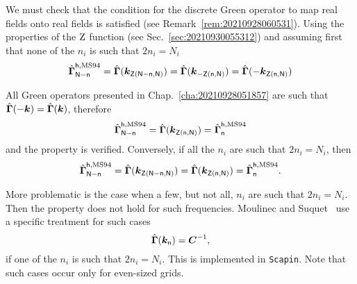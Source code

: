 We must check that the condition for the discrete Green operator to map real
fields onto real fields is satisfied (see
Remark~\ref{rem:20210928060531}). Using the properties of the \(\operatorname{Z}\)
function (see Sec.~\ref{sec:20210930055312}) and assuming first that none of the
\(n_i\) is such that \(2n_i=N_i\)
\begin{equation}
  \hat{\boldsymbol\Gamma}_{\mathsf N-\mathsf n}^{\mathsf h, \mathrm{MS94}}
  =\hat{\boldsymbol\Gamma}(\boldsymbol k_{\mathsf Z(\mathsf N-\mathsf n, \mathsf N)})
  =\hat{\boldsymbol\Gamma}(\boldsymbol k_{-\mathsf Z(\mathsf n, \mathsf N)})
  =\hat{\boldsymbol\Gamma}(-\boldsymbol k_{\mathsf Z(\mathsf n, \mathsf N)})
\end{equation}

All Green operators presented in Chap.~\ref{cha:20210928051857} are such that
\(\hat{\boldsymbol\Gamma}(-\boldsymbol k)=\hat{\boldsymbol\Gamma}(\boldsymbol k)\), therefore
\begin{equation}
  \hat{\boldsymbol\Gamma}_{\mathsf N-\mathsf n}^{\mathsf h, \mathrm{MS94}}
  =\hat{\boldsymbol\Gamma}(\boldsymbol k_{\mathsf Z(\mathsf n, \mathsf N)})
  =\hat{\boldsymbol\Gamma}_{\mathsf n}^{\mathsf h, \mathrm{MS94}}
\end{equation}
and the property is verified. Conversely, if all the \(n_i\) are such that
\(2n_i=N_i\), then
\begin{equation}
  \hat{\boldsymbol\Gamma}_{\mathsf N-\mathsf n}^{\mathsf h, \mathrm{MS94}}
  =\hat{\boldsymbol\Gamma}(\boldsymbol k_{\mathsf Z(\mathsf N-\mathsf n, \mathsf N)})
  =\hat{\boldsymbol\Gamma}(\boldsymbol k_{\mathsf Z(\mathsf n, \mathsf N)})
  =\hat{\boldsymbol\Gamma}_{\mathsf n}^{\mathsf h, \mathrm{MS94}}.
\end{equation}

More problematic is the case when a few, but not all, \(n_i\) are such that
\(2n_i=N_i\). Then the property does not hold for such frequencies. Moulinec and
Suquet~\cite{moul1998} use a specific treatment for such cases
\begin{equation}
  \hat{\boldsymbol\Gamma}(\boldsymbol k_{\mathsf n})=\boldsymbol C^{-1},
\end{equation}
if one of the \(n_i\) is such that \(2n_i=N_i\). This is implemented in
\texttt{Scapin}. Note that such cases occur only for even-sized grids.
